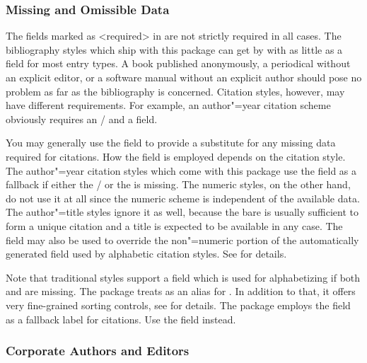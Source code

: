\documentclass{ltxdockit}[2011/03/25]
\begin{document}
\subsubsection{Missing and Omissible Data}
\label{bib:use:key}

The fields marked as <required> in  are not strictly required in all cases. The bibliography styles which ship with this package can get by with as little as a  field for most entry types. A book published anonymously, a periodical without an explicit editor, or a software manual without an explicit author should pose no problem as far as the bibliography is concerned. Citation styles, however, may have different requirements. For example, an author"=year citation scheme obviously requires an \slash {} and a  field.

You may generally use the  field to provide a substitute for any missing data required for citations. How the  field is employed depends on the citation style. The author"=year citation styles which come with this package use the  field as a fallback if either the \slash {} or the  is missing. The numeric styles, on the other hand, do not use it at all since the numeric scheme is independent of the available data. The author"=title styles ignore it as well, because the bare  is usually sufficient to form a unique citation and a title is expected to be available in any case. The  field may also be used to override the non"=numeric portion of the automatically generated  field used by alphabetic citation styles. See  for details.

Note that traditional \bibtex styles support a  field which is used for alphabetizing if both  and  are missing. The  package treats  as an alias for . In addition to that, it offers very fine-grained sorting controls, see  for details. The  package employs the  field as a fallback label for citations. Use the  field instead.

\subsubsection{Corporate Authors and Editors}
\label{bib:use:inc}
\end{document}
